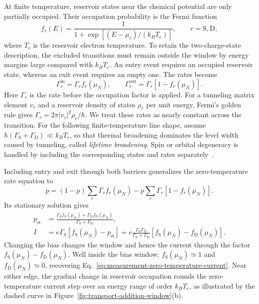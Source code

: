 At finite temperature, reservoir states near the chemical potential
are only partially occupied. Their occupation probability is the
Fermi function
\begin{equation}
 f_r(E)=\frac{1}{1+\exp[(E-\mu_r)/(k_BT_e)]},
 \qquad r=\mathrm S,\mathrm D,
 \label{eq:measurement-fermi-function}
\end{equation}
where $T_e$ is the reservoir electron temperature. To retain the
two-charge-state description, the excluded transitions must remain
outside the window by energy margins large compared with $k_BT_e$.
An entry event
requires an occupied reservoir state, whereas an exit event requires
an empty one. The rates become
\begin{equation}
 \Gamma_r^{\mathrm{in}}=\Gamma_r f_r(\mu_N),\qquad
 \Gamma_r^{\mathrm{out}}=\Gamma_r[1-f_r(\mu_N)].
 \label{eq:measurement-tunnel-rates}
\end{equation}
Here $\Gamma_r$ is the rate before the occupation factor is applied.
For a tunneling matrix element $v_r$ and a reservoir density of
states $\rho_r$ per unit energy, Fermi's golden rule gives
$\Gamma_r=2\pi|v_r|^2\rho_r/\hbar$. We treat these rates as nearly
constant across the transition. For the following finite-temperature
line shape, assume $\hbar(\Gamma_{\mathrm S}+\Gamma_{\mathrm D})
\ll k_BT_e$, so that thermal broadening dominates the level width
caused by tunneling, called \emph{lifetime broadening}. Spin or
orbital degeneracy is handled by including the corresponding states
and rates separately~\cite{Beenakker1991}.

Including entry and exit through both barriers generalizes the
zero-temperature rate equation to
\begin{equation}
 \dot p=(1-p)\sum_r\Gamma_r f_r(\mu_N)
        -p\sum_r\Gamma_r[1-f_r(\mu_N)].
 \label{eq:measurement-master-equation}
\end{equation}
Its stationary solution gives
\begin{equation}
 \begin{aligned}
 p_{\mathrm{st}}&=\frac{\Gamma_{\mathrm S}f_{\mathrm S}(\mu_N)
                  +\Gamma_{\mathrm D}f_{\mathrm D}(\mu_N)}
                         {\Gamma_{\mathrm S}+\Gamma_{\mathrm D}},\\
 I&=e\Gamma_{\mathrm S}[f_{\mathrm S}(\mu_N)-p_{\mathrm{st}}]
   =e\frac{\Gamma_{\mathrm S}\Gamma_{\mathrm D}}
             {\Gamma_{\mathrm S}+\Gamma_{\mathrm D}}
       [f_{\mathrm S}(\mu_N)-f_{\mathrm D}(\mu_N)].
 \end{aligned}
 \label{eq:measurement-sequential-current}
\end{equation}
Changing the bias changes the window and hence the current
through the factor
$f_{\mathrm S}(\mu_N)-f_{\mathrm D}(\mu_N)$.
Well inside the bias window, $f_{\mathrm S}(\mu_N)\simeq1$ and
$f_{\mathrm D}(\mu_N)\simeq0$, recovering
Eq.~\eqref{eq:measurement-zero-temperature-current}. Near either
edge, the gradual change in reservoir occupation rounds the
zero-temperature current step over an energy range of order $k_BT_e$,
as illustrated by the dashed curve in
Figure~\ref{fig:transport-addition-window}(b).

